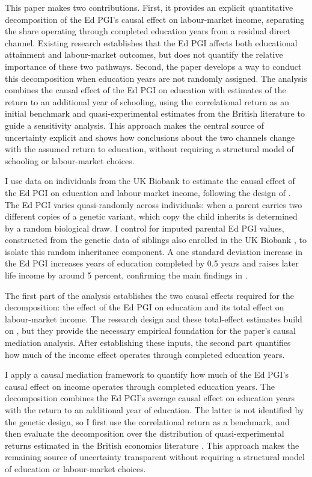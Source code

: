 This paper makes two contributions.
First, it provides an explicit quantitative decomposition of the Ed PGI's causal effect on labour-market income, separating the share operating through completed education years from a residual direct channel.
Existing research establishes that the Ed PGI affects both educational attainment and labour-market outcomes, but does not quantify the relative importance of these two pathways. Second, the paper develops a way to conduct this decomposition when education years are not randomly assigned.
The analysis combines the causal effect of the Ed PGI on education with estimates of the return to an additional year of schooling, using the correlational return as an initial benchmark and quasi-experimental estimates from the British literature to guide a sensitivity analysis.
This approach makes the central source of uncertainty explicit and shows how conclusions about the two channels change with the assumed return to education, without requiring a structural model of schooling or labour-market choices.

I use data on  individuals from the UK Biobank to estimate the causal effect of the Ed PGI on education and labour market income, following the design of \cite{carvalho2024genetics}.
The Ed PGI varies quasi-randomly across individuals: when a parent carries two different copies of a genetic variant, which copy the child inherits is determined by a random biological draw.
I control for imputed parental Ed PGI values, constructed from the genetic data of siblings also enrolled in the UK Biobank \citep{young2022mendelian}, to isolate this random inheritance component.
A one standard deviation increase in the Ed PGI increases years of education completed by 0.5 years and raises later life income by around 5 percent, confirming the main findings in \cite{carvalho2024genetics}.

The first part of the analysis establishes the two causal effects required for the decomposition: the effect of the Ed PGI on education and its total effect on labour-market income.
The research design and these total-effect estimates build on \citet{carvalho2024genetics}, but they provide the necessary empirical foundation for the paper's causal mediation analysis.
After establishing these inputs, the second part quantifies how much of the income effect operates through completed education years.

I apply a causal mediation framework to quantify how much of the Ed PGI's causal effect on income operates through completed education years.
The decomposition combines the Ed PGI's average causal effect on education years with the return to an additional year of education.
The latter is not identified by the genetic design, so I first use the correlational return as a benchmark, and then evaluate the decomposition over the distribution of quasi-experimental returns estimated in the British economics literature \citep{patrinos2025causal}.
This approach makes the remaining source of uncertainty transparent without requiring a structural model of education or labour-market choices.

